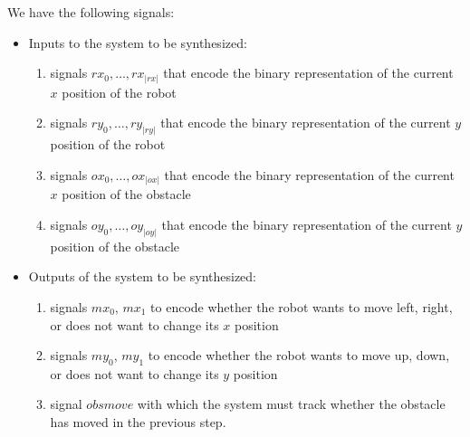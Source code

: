 \documentclass[a4paper,conference,10pt]{IEEEtran}
\begin{document}
\noindent We have the following signals:
\begin{itemize}
\item Inputs to the system to be synthesized:
\begin{enumerate}
\item signals $\mathit{rx}_0, \ldots, \mathit{rx}_{|\mathit{rx}|}$ that encode the binary representation of the current $x$ position of the robot 
\item signals $\mathit{ry}_0, \ldots, \mathit{ry}_{|\mathit{ry}|}$ that encode the binary representation of the current $y$ position of the robot
\item signals $\mathit{ox}_0, \ldots, \mathit{ox}_{|\mathit{ox}|}$ that encode the binary representation of the current $x$ position of the obstacle
\item signals $\mathit{oy}_0, \ldots, \mathit{oy}_{|\mathit{oy}|}$ that encode the binary representation of the current $y$ position of the obstacle
\end{enumerate}
\item Outputs of the system to be synthesized:
\begin{enumerate}
\item signals $\mathit{mx}_0$, $\mathit{mx}_1$ to encode whether the robot wants to move left, right, or does not want to change its $x$ position
\item signals $\mathit{my}_0$, $\mathit{my}_1$ to encode whether the robot wants to move up, down, or does not want to change its $y$ position
\item signal $\mathit{obsmove}$ with which the system must track whether the obstacle has moved in the previous step.
\end{enumerate}
\end{itemize}
\end{document}
